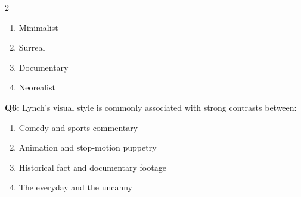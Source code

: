 \documentclass[10pt]{article}
\begin{document}
\begin{multicols}{2}
\begin{enumerate}[label=\arabic*.]
\item Minimalist
\item Surreal
\item Documentary
\item Neorealist
\end{enumerate}
\textbf{Q6:} Lynch's visual style is commonly associated with strong contrasts between:

\begin{enumerate}[label=\arabic*.]
\item Comedy and sports commentary
\item Animation and stop-motion puppetry
\item Historical fact and documentary footage
\item The everyday and the uncanny
\end{enumerate}
\end{multicols}

\newpage
\end{document}
